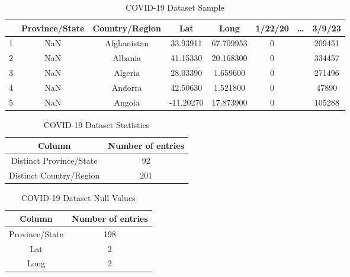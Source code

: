 \documentclass[12pt,oneside]{book} %
\begin{document}
\begin{table}[h!]
    \centering
    \captionsetup{font=large}
    \caption{COVID-19 Dataset Sample}
    \normalsize
    \begin{tabular}{|c|c|c|c|c|c|c|c|}
        \hline
          & Province/State & Country/Region & Lat       & Long      & 1/22/20 & \ldots & 3/9/23 \\
        \hline
        1 & NaN            & Afghanistan    & 33.93911  & 67.709953 & 0       &        & 209451 \\
        2 & NaN            & Albania        & 41.15330  & 20.168300 & 0       &        & 334457 \\
        3 & NaN            & Algeria        & 28.03390  & 1.659600  & 0       &        & 271496 \\
        4 & NaN            & Andorra        & 42.50630  & 1.521800  & 0       &        & 47890  \\
        5 & NaN            & Angola         & -11.20270 & 17.873900 & 0       &        & 105288 \\
        \hline
    \end{tabular}\label{tab:covid19-dataset-sample}
\end{table}

\begin{table}[h!]
    \centering
    \captionsetup{font=large}
    \caption{COVID-19 Dataset Statistics}
    \normalsize
    \begin{tabular}{|c|c|}
        \hline
        Column                  & Number of entries \\
        \hline
        Distinct Province/State & 92                \\
        Distinct Country/Region & 201               \\
        \hline
    \end{tabular}\label{tab:covid19-dataset-distinct-values}
\end{table}

\begin{table}[h!]
    \centering
    \captionsetup{font=large}
    \caption{COVID-19 Dataset Null Values}
    \normalsize
    \begin{tabular}{|c|c|}
        \hline
        Column         & Number of entries \\
        \hline
        Province/State & 198               \\
        Lat            & 2                 \\
        Long           & 2                 \\
        \hline
    \end{tabular}\label{tab:covid19-dataset-null-values}
\end{table}
\end{document}
